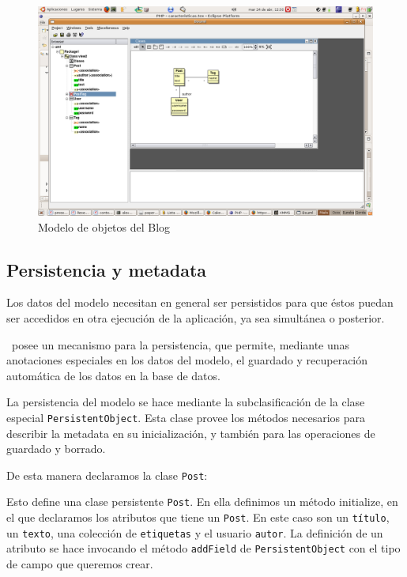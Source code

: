 \begin{figure}[h]
	\centering
	\includegraphics*[scale=0.60,viewport=420 350 700 600]{images/diagrama.png}
 	\caption{Modelo de objetos del Blog}
 	\label{fig-model1}
\end{figure}

\subsection{Persistencia y metadata}
\label{sub-pers}

Los datos del modelo necesitan en general ser persistidos para que éstos puedan ser accedidos en otra ejecución de la aplicación, ya sea simultánea o posterior.

\PWB \ posee un mecanismo para la persistencia, que permite, mediante unas anotaciones especiales en los datos del modelo, el guardado y recuperación automática de los datos en la base de datos.

La persistencia del modelo se hace mediante la subclasificación de la clase especial \verb"PersistentObject". Esta clase provee los métodos necesarios para describir la metadata en su inicialización, y también para las operaciones de guardado y borrado.

De esta manera declaramos la clase \verb"Post":

\begin{lgrind}

\end{lgrind}

Esto define una clase persistente \verb"Post". En ella definimos un método initialize, en el que declaramos los atributos que tiene un \verb"Post". En este caso son un \verb"título", un \verb"texto", una colección de \verb"etiquetas" y el usuario \verb"autor". La definición de un atributo se hace invocando el método \verb"addField" de \verb"PersistentObject" con el tipo de campo que queremos crear.

